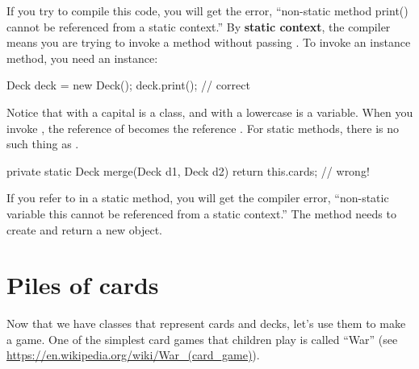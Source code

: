 

If you try to compile this code, you will get the error, ``non-static method print() cannot be referenced from a static context.''
By {\bf static context}, the compiler means you are trying to invoke a method without passing .
To invoke an instance method, you need an instance:

\begin{code}
Deck deck = new Deck();
deck.print();  // correct
\end{code}

Notice that  with a capital  is a class, and  with a lowercase  is a variable.
When you invoke , the reference of  becomes the reference .
For static methods, there is no such thing as .

\begin{code}
private static Deck merge(Deck d1, Deck d2) {
    return this.cards;  // wrong!
}
\end{code}

If you refer to  in a static method, you will get the compiler error, ``non-static variable this cannot be referenced from a static context.''
The  method needs to create and return a new  object.


%


\section{Piles of cards}


Now that we have classes that represent cards and decks, let's use them to make a game.
One of the simplest card games that children play is called ``War'' (see \url{https://en.wikipedia.org/wiki/War_(card_game)}).

